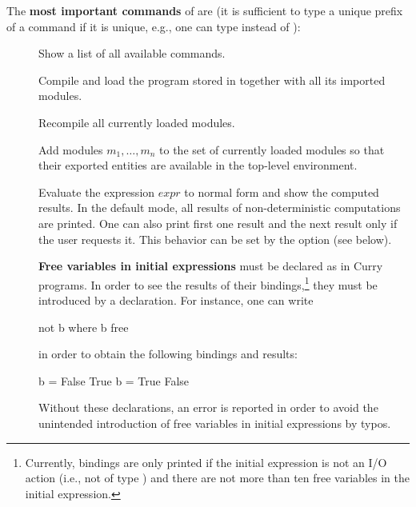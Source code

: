 The {\bf most important commands} of \CYS are
(it is sufficient to type a unique prefix of a command if it is unique,
e.g., one can type  instead of ):

\begin{description}
\item[]
Show a list of all available commands.

\item[]
Compile and load the program stored in 
together with all its imported modules.

\item[]
Recompile all currently loaded modules.

\item[]
Add modules $m_1,\ldots,m_n$ to the set of currently loaded modules
so that their exported entities are available in the top-level environment.

\item[] Evaluate the expression $expr$ to normal form
and show the computed results.
In the default mode, all results of
non-deterministic computations are printed.
One can also print first one result and the next result
only if the user requests it. This behavior can be set by
the option  (see below).

\textbf{Free variables in initial expressions} must be declared as
in Curry programs.
In order to see the results of their bindings,\footnote{Currently,
bindings are only printed if the initial expression is not an I/O action
(i.e., not of type )
and there are not more than ten free variables
in the initial expression.}
they must be introduced by a  declaration.
For instance, one can write
\begin{curry}
not b where b free
\end{curry}
in order to obtain the following bindings and results:
\begin{curry}
{b = False} True
{b = True} False
\end{curry}
Without these declarations, an error is reported in order to
avoid the unintended introduction of free variables in initial expressions
by typos.


\end{description}
